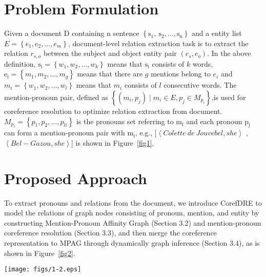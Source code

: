 \documentclass{article}
\begin{document}
\section{Problem Formulation}

Given a document $\mathrm{D}$ containing n sentence $\left\{\mathrm{s}_{1}, \mathrm{~s}_{2}, \ldots, \mathrm{s}_{\mathrm{n}}\right\}$ and a entity list $E=\left\{e_{1}, e_{2}, \ldots, e_{m}\right\}$, document-level relation extraction task is to extract the relation $r_{s, o}$ between the subject and object entity pair $\left(e_{s}, e_{o}\right)$. In the above definition, $\mathrm{s}_{\mathrm{i}}=\left\{w_{1}, w_{2}, \ldots, w_{k}\right\}$ means that $\mathrm{s}_{\mathrm{i}}$ consists of $k$ words, $\mathrm{e}_{\mathrm{i}}=\left\{m_{1}, m_{2}, \ldots, m_{g}\right\}$ means that there are $g$ mentions belong to $e_{i}$ and $m_{i}=\left\{w_{1}, w_{2}, \ldots, w_{l}\right\}$ means that $m_{i}$ consists of $l$ consecutive words.
The mention-pronoun pair, defined as $\left\{\left(m_{i}, p_{j}\right) \mid m_{i} \in E, p_{j} \in M_{p_{i}}\right\}$,is used for coreference resolution to optimize relation extraction from document. $M_{p_{i}}=\left\{p_{1}, p_{2}, \ldots, p_{l i}\right\}$ is the pronouns set referring to $\mathrm{m}_{\mathrm{i}}$ and each pronoun $\mathrm{p}_{\mathrm{j}}$ can form a mention-pronoun pair with $\mathrm{m}_{\mathrm{i}}$, e.g., [$\left< Colette~de~Jouvebel, she \right>$ , $\left<Bel-Gazou, she \right>$] is shown in Figure~\ref{fig1}.

\section{Proposed Approach}

To extract pronouns and relations from the document, we introduce CorefDRE to model the relations of graph nodes consisting  of pronoun, mention, and entity by constructing Mention-Pronoun Affinity Graph (Section 3.2) and mention-pronoun coreference resolution (Section 3.3), and then merge the coreference representation to MPAG through dynamically graph inference (Section 3.4), as is shown in  Figure~\ref{fig2}.

\begin{figure*}[ht]
    \centering
    \setlength{\abovecaptionskip}{0cm}
    \setlength{\belowcaptionskip}{-0.4cm}
    \vspace{-0.8cm}
    \texttt{[image: figs/1-2.eps]}
    \caption{Architecture of our CorefDRE. First, the document is fed into encoder respectively, and then MPAG is constructed with pronoun nodes and mention nodes. Second, mention-pronoun coreference resolution takes use of contextualized representation and mention-pronoun pairs to calculate affinity. Third, merge the output of mention-pronoun coreference resolution to MPAG with noise suppression mechanism by applying GCN. Finally, the graph is transformed into EG, where the paths between entities are identified for reasoning. Different entities are drawn with colors, the squares represent the relationship between entity pairs, and the number in each circle is the sentence number.}
    \label{fig2}
\end{figure*}
\end{document}
